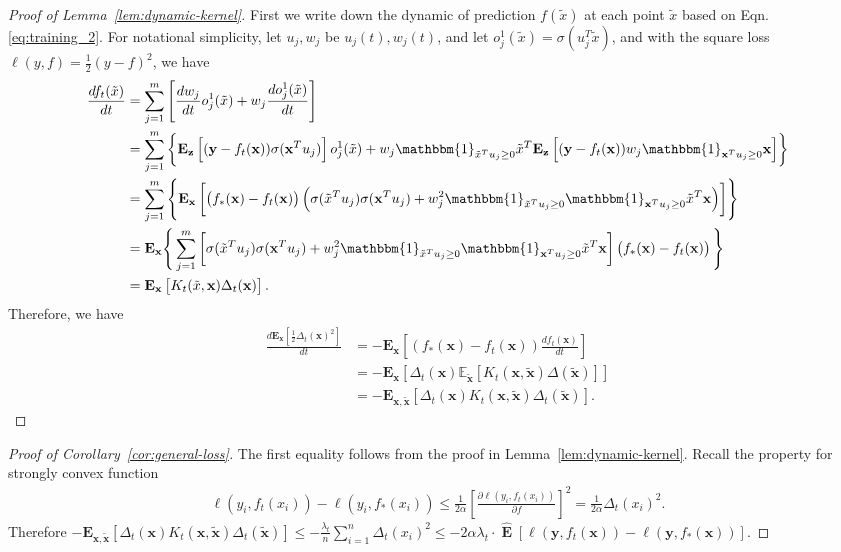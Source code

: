 \documentclass[11pt]{article}
\numberwithin{equation}{section}
\def\E{\mathop{\mathbf{E}}}
\def\bd#1{\mathbf{#1}}
\def\bx{\bd{x}}
\def\by{\bd{y}}
\begin{document}
\begin{proof}[Proof of Lemma~\ref{lem:dynamic-kernel}]
	 First we write down the dynamic of prediction $f(\tilde{x})$ at each point $\tilde{x}$ based on Eqn. \eqref{eq:training_2}. For notational simplicity, let $u_j,w_j$ be $u_j(t),w_j(t)$, and let $o^{1}_j(\tilde{x}) = \sigma(u_j^T\tilde{x})$, and with the square loss $\ell(y, f) = \frac{1}{2}(y - f)^2$, we have
 		\begin{align*}		
 			\frac{df_t(\tilde{x})}{dt} &= \sum_{j=1}^m \left[ \frac{dw_j}{dt}o^{1}_j(\tilde{x})  +w_j\frac{do ^{1}_j(\tilde{x})}{dt} \right]\\	
			&= \sum_{j=1}^m \left\{  \mathbf{E}_{\bd{z}}\left[(\by - f_t(\bx))\sigma(\bx^Tu_j)\right] o^{1}_j(\tilde{x}) + w_j \mathbbm{1}_{\tilde{x}^Tu_j\geq0} \tilde{x}^T \mathbf{E}_{\bd{z}}\left[(\by - f_t(\bx))w_j \mathbbm{1}_{\bx^Tu_j\geq0}\bx \right]  \right\} \\
 			&= \sum_{j=1}^m \left\{ \mathbf{E}_{\bd{x}}\left[ \left(f_*(\bd{x})-f_t(\bd{x})\right) \left( \sigma(\tilde{x}^Tu_j)\sigma(\bx^Tu_j) + w^2_j\mathbbm{1}_{\tilde{x}^Tu_j\geq0}\mathbbm{1}_{\bx^Tu_j\geq0}\tilde{x}^T\bx  \right)   \right] \right\} \\		
 			&= \mathbf{E}_{\bd{x}}\Bigg\{ \sum_{j=1}^m \bigg[\sigma(\tilde{x}^Tu_j)\sigma(\bx^Tu_j)  + w^2_j\mathbbm{1}_{\tilde{x}^Tu_j\geq0}\mathbbm{1}_{\bx^Tu_j\geq0}\tilde{x}^T\bx \bigg]   \left(f_*(\bx)-f_t(\bx)\right) \Bigg\} \\		
 			&= \mathbf{E}_{\bd{x}} \left[ K_t(\tilde{x},\bd{x})\Delta_t(\bd{x}) \right]. 	
 		\end{align*}		
 		Therefore, we have		
 		\begin{align}\label{eq:residual}		
 			\frac{d\mathbf{E}_{ \bd{x}}\left[\frac{1}{2}\Delta_t(\bd{x})^2\right]}{dt} &= - \mathbf{E}_{ \bd{x}} \left[ (f_*(\bx) - f_t(\bx)) \frac{d f_t(\bd{x})}{dt} \right] \\
			&= - \mathbf{E}_{ \bd{x}} \left[ \Delta_t(\bx) \mathbb{E}_{\tilde{\bx}} \left[ K_t(\bd{x},\bd{\tilde x}) \Delta(\bd{\tilde x}) \right] \right] \nonumber \\
			&=  -\mathbf{E}_{\bd{x}, \bd{\tilde x}}\left[ \Delta_t(\bd{x})K_t(\bd{x}, \bd{\tilde x})\Delta_t(\bd{\tilde x})\right] \nonumber.
 		\end{align}
\end{proof}


\begin{proof}[Proof of Corollary~\ref{cor:general-loss}]
	The first equality follows from the proof in Lemma~\ref{lem:dynamic-kernel}. Recall the property for strongly convex function
	\begin{align}
		\ell(y_i, f_t(x_i)) - \ell(y_i, f_*(x_i)) \leq \frac{1}{2\alpha} \left[ \frac{\partial \ell(y_i, f_t(x_i))}{\partial f} \right]^2 = \frac{1}{2\alpha} \Delta_t(x_i)^2.
	\end{align}
	Therefore $-\mathbf{E}_{\bd{x}, \bd{\tilde x}}\left[ \Delta_t(\bd{x})K_t(\bd{x}, \bd{\tilde x})\Delta_t(\bd{\tilde x})\right] \leq -\frac{\lambda_t}{n} \sum_{i=1}^n \Delta_t(x_i)^2 \leq - 2\alpha\lambda_t \cdot \widehat{\E} \left[\ell(\by, f_t(\bx)) - \ell(\by, f_*(\bx))\right].$
\end{proof}
\end{document}

